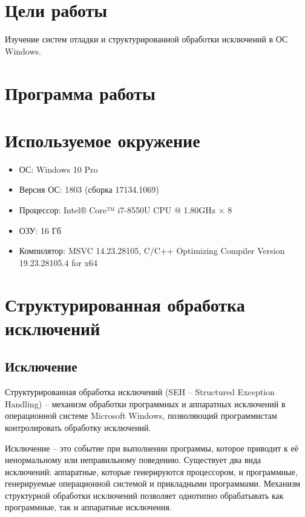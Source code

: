 





\tableofcontents
\newpage

\section{Цели работы}

Изучение систем отладки и структурированной обработки исключений в ОС Windows.

\section{Программа работы}



\section{Используемое окружение}

\begin{itemize}
	\item ОС: Windows 10 Pro
	\item Версия ОС: 1803 (сборка 17134.1069)
	\item Процессор: Intel® Core™ i7-8550U CPU @ 1.80GHz × 8
	\item ОЗУ: 16 Гб
	\item Компилятор: MSVC 14.23.28105, C/C++ Optimizing Compiler Version 19.23.28105.4 for x64
\end{itemize}

\section{Структурированная обработка исключений}

\subsection{Исключение}

Структурированная обработка исключений (SEH -- Structured Exception Handling) -- механизм обработки программных и аппаратных исключений в операционной системе Microsoft Windows, позволяющий программистам контролировать обработку исключений.

Исключение -- это событие при выполнении программы, которое приводит к её ненормальному или неправильному поведению. Существует два вида исключений: аппаратные, которые генерируются процессором, и программные, генерируемые операционной системой и прикладными программами. Механизм структурной обработки исключений позволяет однотипно обрабатывать как программные, так и аппаратные исключения.

